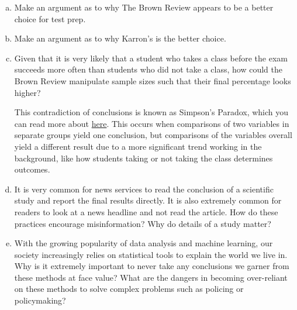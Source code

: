 \documentclass[12pt,letterpaper]{article}
\begin{document}
    \begin{enumerate}[a.]
    \item Make an argument as to why The Brown Review appears to be a better choice for test prep.\\
    \begin{mdframed} \vspace{1.5cm} \end{mdframed}
    
   \item Make an argument as to why Karron's is the better choice.\\
   
    \begin{mdframed} \vspace{1.5cm} \end{mdframed}
    
   \item  Given that it is very likely that a student who takes a class before the exam succeeds more often than students who did not take a class, how could the Brown Review manipulate sample sizes such that their final percentage looks higher?\\
   
   \begin{mdframed} \vspace{3cm} \end{mdframed}
   
   This contradiction of conclusions is known as Simpson's Paradox, which you can read more about \href{https://towardsdatascience.com/simpsons-paradox-how-to-prove-two-opposite-arguments-using-one-dataset-1c9c917f5ff9}{here}. This occurs when comparisons of two variables in separate groups yield one conclusion, but comparisons of the variables overall yield a different result due to a more significant trend working in the background, like how students taking or not taking the class determines outcomes.
   
   \item It is very common for news services to read the conclusion of a scientific study and report the final results directly. It is also extremely common for readers to look at a news headline and not read the article. How do these practices encourage misinformation? Why do details of a study matter?
   
   \begin{mdframed} \vspace{3cm} \end{mdframed}
   
   \item With the growing popularity of data analysis and machine learning, our society increasingly relies on statistical tools to explain the world we live in. Why is it extremely important to never take any conclusions we garner from these methods at face value? What are the dangers in becoming over-reliant on these methods to solve complex problems such as policing or policymaking?
   
 \begin{mdframed} \vspace{3cm} \end{mdframed}
   \end{enumerate}
\end{document}
